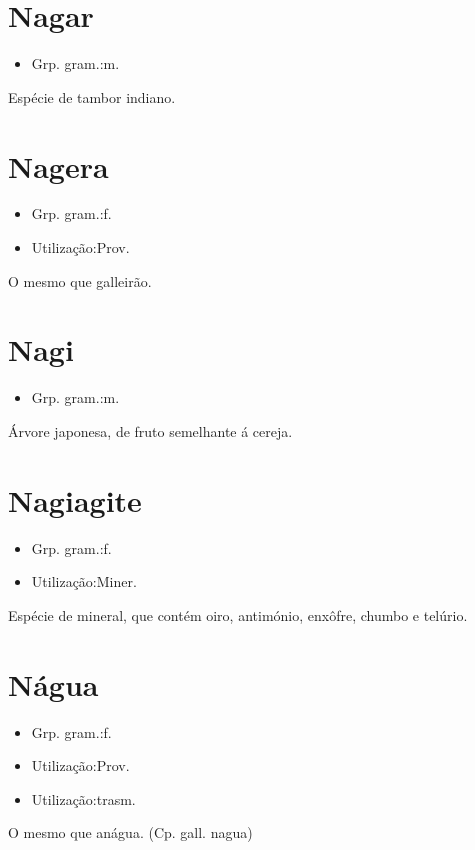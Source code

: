 \section{Nagar}
\begin{itemize}
\item {Grp. gram.:m.}
\end{itemize}
Espécie de tambor indiano.
\section{Nagera}
\begin{itemize}
\item {Grp. gram.:f.}
\end{itemize}
\begin{itemize}
\item {Utilização:Prov.}
\end{itemize}
O mesmo que \textunderscore galleirão\textunderscore .
\section{Nagi}
\begin{itemize}
\item {Grp. gram.:m.}
\end{itemize}
Árvore japonesa, de fruto semelhante á cereja.
\section{Nagiagite}
\begin{itemize}
\item {Grp. gram.:f.}
\end{itemize}
\begin{itemize}
\item {Utilização:Miner.}
\end{itemize}
Espécie de mineral, que contém oiro, antimónio, enxôfre, chumbo e telúrio.
\section{Nágua}
\begin{itemize}
\item {Grp. gram.:f.}
\end{itemize}
\begin{itemize}
\item {Utilização:Prov.}
\end{itemize}
\begin{itemize}
\item {Utilização:trasm.}
\end{itemize}
O mesmo que \textunderscore anágua\textunderscore .
(Cp. gall. \textunderscore nagua\textunderscore )
